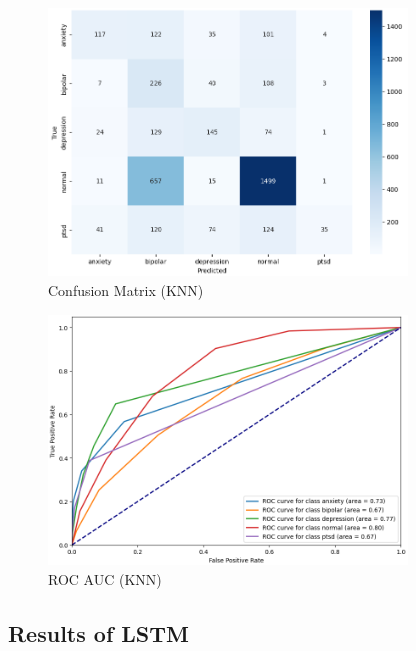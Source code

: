 \begin{figure}[h!]  
    \centering
    \includegraphics[width=0.85\textwidth]{Images/KNN Confusion Matrix.png}  
    \caption{Confusion Matrix (KNN)}
    \label{KNNCM}  %
\end{figure}

\begin{figure}[h!]  
    \centering
    \includegraphics[width=0.85\textwidth]{Images/KNN ROC.png}  
    \caption{ROC AUC (KNN)}
    \label{KNnROC}  %
\end{figure}



\subsection{Results of LSTM}

